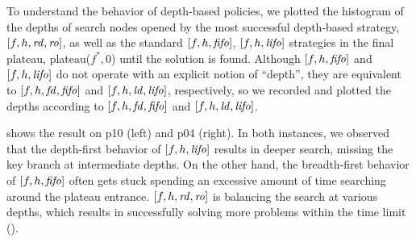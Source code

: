 To understand the behavior of depth-based policies, we plotted the histogram of
the depths of search nodes opened by
the most successful depth-based strategy, $[f,h,{\mbox{\textit{rd}}},{\mbox{\textit{ro}}}]$, as well as 
the standard $[f,h,{\mbox{\textit{fifo}}}]$, $[f,h,{\mbox{\textit{lifo}}}]$ strategies
in the final plateau, plateau($f^*,0$) until the solution is found.
% 
Although $[f,h,{\mbox{\textit{fifo}}}]$ and $[f,h,{\mbox{\textit{lifo}}}]$ do not operate with an explicit notion of ``depth'', 
they are equivalent to $[f,h,{\mbox{\textit{fd}}},{\mbox{\textit{fifo}}}]$ and $[f,h,{\mbox{\textit{ld}}},{\mbox{\textit{lifo}}}]$, respectively,
so we recorded and plotted the depths according to  $[f,h,{\mbox{\textit{fd}}},{\mbox{\textit{fifo}}}]$ and $[f,h,{\mbox{\textit{ld}}},{\mbox{\textit{lifo}}}]$.


 shows the result
on
  p10 (left) and
  p04 (right).
In both instances, 
we observed that the depth-first behavior of $[f,h,{\mbox{\textit{lifo}}}]$ results in 
deeper search, missing the key branch at intermediate depths.
On the other hand, the breadth-first behavior of $[f,h,{\mbox{\textit{fifo}}}]$ often gets stuck spending an excessive amount of time searching around the plateau entrance.
$[f,h,{\mbox{\textit{rd}}},{\mbox{\textit{ro}}}]$ is balancing the search at various depths, which results in successfully solving more problems within the time limit (). %


